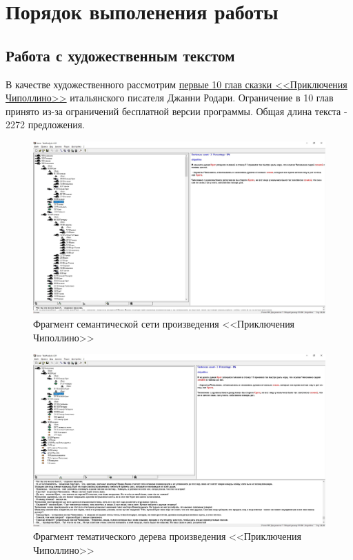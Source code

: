 	
	\section{Порядок выполенения работы}
			
			
			\subsection{Работа с художественным текстом}
				В качестве художественного рассмотрим \href{./listings/chipollino-source.txt}{первые 10 глав сказки <<Приключения Чиполлино>>} итальянского писателя Джанни Родари.
				Ограничение в 10 глав принято из-за ограничений бесплатной версии программы.
				Общая длина текста - 2272 предложения.
			
			\begin{figure}[h]
				\centering
				\includegraphics[width=0.7\linewidth]{images/semantic-net}
				\caption{Фрагмент семантической сети произведения <<Приключения Чиполлино>>}
				\label{fig:semantic-net}
			\end{figure}
			\begin{figure}[h]
				\centering
				\includegraphics[width=0.7\linewidth]{images/chipollino-theme-tree}
				\caption{Фрагмент тематического дерева произведения <<Приключения Чиполлино>>}
				\label{fig:chipollino-theme-tree}
			\end{figure}
	
		\FloatBarrier
			
